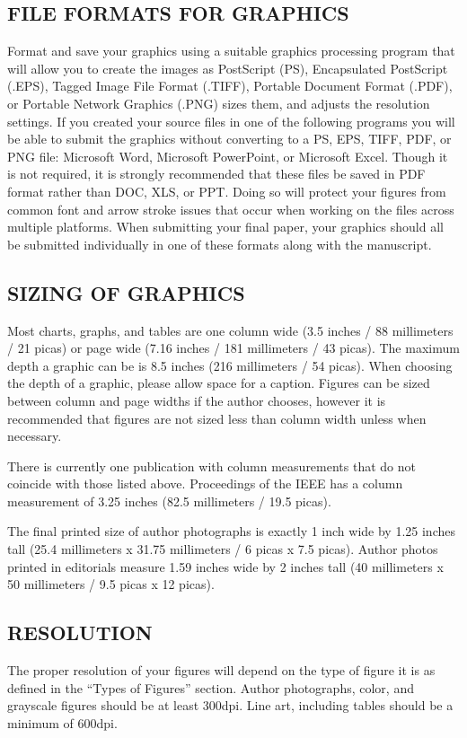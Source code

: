 \documentclass{IEEEoj}
\begin{document}
\subsection{FILE FORMATS FOR GRAPHICS}
Format and save your graphics using a suitable graphics processing program 
that will allow you to create the images as PostScript (PS), Encapsulated 
PostScript (.EPS), Tagged Image File Format (.TIFF), Portable Document 
Format (.PDF), or Portable Network Graphics (.PNG) sizes them, and adjusts 
the resolution settings. If you created your source files in one of the 
following programs you will be able to submit the graphics without 
converting to a PS, EPS, TIFF, PDF, or PNG file: Microsoft Word, Microsoft 
PowerPoint, or Microsoft Excel. Though it is not required, it is strongly 
recommended that these files be saved in PDF format rather than DOC, XLS, or 
PPT. Doing so will protect your figures from common font and arrow stroke 
issues that occur when working on the files across multiple platforms. When 
submitting your final paper, your graphics should all be submitted 
individually in one of these formats along with the manuscript.

\subsection{SIZING OF GRAPHICS}
Most charts, graphs, and tables are one column wide (3.5 inches / 88 
millimeters / 21 picas) or page wide (7.16 inches / 181 millimeters / 43 
picas). The maximum depth a graphic can be is 8.5 inches (216 millimeters / 
54 picas). When choosing the depth of a graphic, please allow space for a 
caption. Figures can be sized between column and page widths if the author 
chooses, however it is recommended that figures are not sized less than 
column width unless when necessary.

There is currently one publication with column measurements that do not 
coincide with those listed above. Proceedings of the IEEE has a column 
measurement of 3.25 inches (82.5 millimeters / 19.5 picas). 

The final printed size of author photographs is exactly 
1 inch wide by 1.25 inches tall (25.4 millimeters x 31.75 millimeters / 6 
picas x 7.5 picas). Author photos printed in editorials measure 1.59 inches 
wide by 2 inches tall (40 millimeters x 50 millimeters / 9.5 picas x 12 
picas).

\subsection{RESOLUTION}
The proper resolution of your figures will depend on the type of figure it 
is as defined in the ``Types of Figures'' section. Author photographs, 
color, and grayscale figures should be at least 300dpi. Line art, including 
tables should be a minimum of 600dpi.
\end{document}

